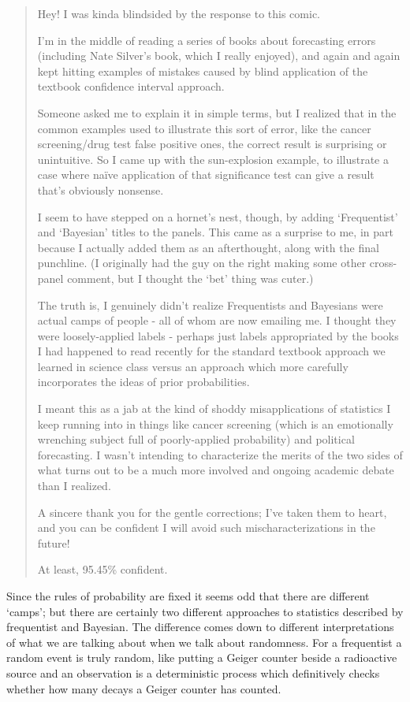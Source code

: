 \documentclass[12pt]{article}
\begin{document}
\begin{quote}
Hey! I was kinda blindsided by the response to this comic.

I'm in the middle of reading a series of books about forecasting
errors (including Nate Silver's book, which I really enjoyed), and
again and again kept hitting examples of mistakes caused by blind
application of the textbook confidence interval approach.

Someone asked me to explain it in simple terms, but I realized that in
the common examples used to illustrate this sort of error, like the
cancer screening/drug test false positive ones, the correct result is
surprising or unintuitive. So I came up with the sun-explosion
example, to illustrate a case where na\"{i}ve application of that
significance test can give a result that's obviously nonsense.

I seem to have stepped on a hornet's nest, though, by adding
\lq{}Frequentist\rq{} and \lq{}Bayesian\rq{} titles to the
panels. This came as a surprise to me, in part because I actually
added them as an afterthought, along with the final punchline. (I
originally had the guy on the right making some other cross-panel
comment, but I thought the \lq{}bet\rq{} thing was cuter.)

The truth is, I genuinely didn't realize Frequentists and Bayesians
were actual camps of people - all of whom are now emailing me. I thought
they were loosely-applied labels - perhaps just labels appropriated by
the books I had happened to read recently for the standard textbook
approach we learned in science class versus an approach which more
carefully incorporates the ideas of prior probabilities.

I meant this as a jab at the kind of shoddy misapplications of
statistics I keep running into in things like cancer screening (which
is an emotionally wrenching subject full of poorly-applied
probability) and political forecasting. I wasn't intending to
characterize the merits of the two sides of what turns out to be a
much more involved and ongoing academic debate than I realized.

A sincere thank you for the gentle corrections; I've taken them to
heart, and you can be confident I will avoid such mischaracterizations
in the future!

At least, 95.45\% confident.
\end{quote}

Since the rules of probability are fixed it seems odd that there are
different \lq{}camps\rq{}; but there are certainly two different
approaches to statistics described by frequentist and Bayesian. The
difference comes down to different interpretations of what we are
talking about when we talk about randomness. For a frequentist a
random event is truly random, like putting a Geiger counter beside a
radioactive source and an observation is a deterministic process which
definitively checks whether how many decays a Geiger counter has
counted. 
\end{document}
